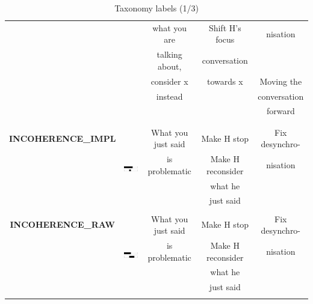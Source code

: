 \begin{table}[htp]
{\begin{tabular}{|c|c|c|c|c|}
              	& & what you are & \tabitem Shift H's focus & nisation \\
             	& & talking about, & conversation & \\
             	& & consider x & towards x & \tabitem Moving the \\
             	& & instead & & conversation \\
               	& & & & forward \\
              	& & & & \\
				& & & & \\
               	\hline
               	\rule{0pt}{4ex}
          		\textbf{INCOHERENCE\_IMPL} & \multirow{5}{*}{\includegraphics[scale=0.5]{figures/TTPProfiles/implBargeIn.pdf}} & What you just said & \tabitem Make H stop & \tabitem Fix desynchro- \\
             	& & is problematic & \tabitem Make H reconsider & nisation \\
            	& & & what he & \\
               	& & & just said & \\
				& & & & \\
               	\hline
              	\rule{0pt}{4ex}
              	\textbf{INCOHERENCE\_RAW} & \multirow{5}{*}{\includegraphics[scale=0.5]{figures/TTPProfiles/shortBargeIn.pdf}} & What you just said & \tabitem Make H stop & \tabitem Fix desynchro- \\
          		& & is problematic & \tabitem Make H reconsider & nisation \\
        		& & & what he & \\
            	& & & just said & \\
				& & & & \\
               	\hline
        	\end{tabular}
		}
        \caption{Taxonomy labels (1/3)}
        \label{tab:taxosynth}
  	\end{table}

